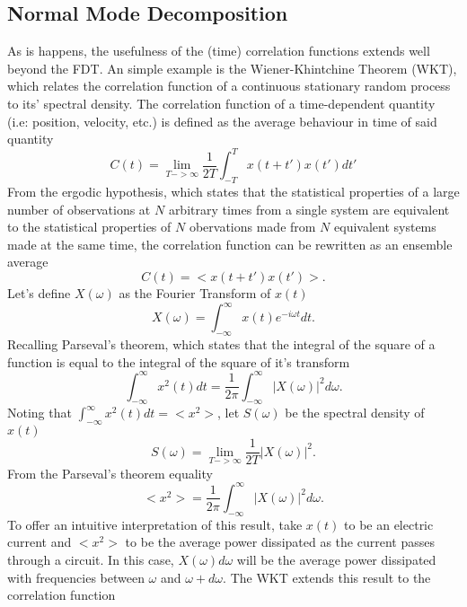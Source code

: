 \subsection{Normal Mode Decomposition}

As is happens, the usefulness of the (time) correlation functions extends well beyond the FDT. An simple example is the Wiener-Khintchine Theorem (WKT), which relates the correlation function of a continuous stationary random process to its' spectral density. The correlation function of a time-dependent quantity (i.e: position, velocity, etc.) is defined as the average behaviour in time of said quantity \cite{mcquarrie}
%
\begin{equation}
C(t)=\lim_{T->\infty}\frac{1}{2T}\int_{-T}^{T}x(t+t')x(t')dt'
\end{equation}
%
From the ergodic hypothesis, which states that the statistical properties of a large number of observations at $N$ arbitrary times from a single system are equivalent to the statistical properties of $N$ obervations made from $N$ equivalent systems made at the same time, the correlation function can be rewritten as an ensemble average
%
\begin{equation}
C(t)=<x(t+t')x(t')>.
\end{equation}
%
Let's define $X(\omega)$ as the Fourier Transform of $x(t)$
%
\begin{equation}
X(\omega)=\int_{-\infty}^{\infty}x(t)e^{-i\omega t}dt.
\end{equation}
%
Recalling Parseval's theorem, which states that the integral of the square of a function is equal to the integral of the square of it's transform
%
\begin{equation}
\int_{-\infty}^{\infty}x^2(t)dt=\frac{1}{2\pi}\int_{-\infty}^{\infty}|X(\omega)|^2d\omega.
\end{equation}
%
Noting that $\int_{-\infty}^{\infty}x^2(t)dt=<x^2>$, let $S(\omega)$ be the spectral density of $x(t)$
%
\begin{equation}
S(\omega)=\lim_{T->\infty}\frac{1}{2T}|X(\omega)|^2.
\end{equation}
%
From the Parseval's theorem equality
%
\begin{equation}
<x^2>=\frac{1}{2\pi}\int_{-\infty}^{\infty}|X(\omega)|^2d\omega.
\end{equation}
%
To offer an intuitive interpretation of this result, take $x(t)$ to be an electric current and $<x^2>$ to be the average power dissipated as the current passes through a circuit. In this case, $X(\omega)d\omega$ will be the average power dissipated with frequencies between $\omega$ and $\omega+d\omega$. The WKT extends this result to the correlation function
